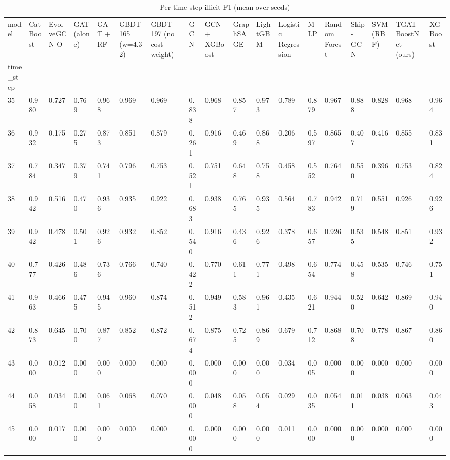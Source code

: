 \begin{table}
\caption{Per-time-step illicit F1 (mean over seeds)}
\label{tab:03_per_timestep_f1}
\begin{tabular}{llllllllllllllllll}
\toprule
model & CatBoost & EvolveGCN-O & GAT (alone) & GAT + RF & GBDT-165 (w=4.32) & GBDT-197 (no cost weight) & GCN & GCN + XGBoost & GraphSAGE & LightGBM & Logistic Regression & MLP & Random Forest & Skip-GCN & SVM (RBF) & TGAT-BoostNet (ours) & XGBoost \\
time\_step &  &  &  &  &  &  &  &  &  &  &  &  &  &  &  &  &  \\
\midrule
35 & 0.980 & 0.727 & 0.769 & 0.968 & 0.969 & 0.969 & 0.838 & 0.968 & 0.857 & 0.973 & 0.789 & 0.879 & 0.967 & 0.888 & 0.828 & 0.968 & 0.964 \\
36 & 0.932 & 0.175 & 0.275 & 0.873 & 0.851 & 0.879 & 0.261 & 0.916 & 0.469 & 0.868 & 0.206 & 0.597 & 0.865 & 0.407 & 0.416 & 0.855 & 0.831 \\
37 & 0.784 & 0.347 & 0.379 & 0.741 & 0.796 & 0.753 & 0.521 & 0.751 & 0.648 & 0.758 & 0.458 & 0.552 & 0.764 & 0.550 & 0.396 & 0.753 & 0.824 \\
38 & 0.942 & 0.516 & 0.470 & 0.936 & 0.935 & 0.922 & 0.683 & 0.938 & 0.765 & 0.935 & 0.564 & 0.783 & 0.942 & 0.719 & 0.551 & 0.926 & 0.926 \\
39 & 0.942 & 0.478 & 0.501 & 0.926 & 0.932 & 0.852 & 0.540 & 0.916 & 0.436 & 0.926 & 0.378 & 0.657 & 0.926 & 0.535 & 0.548 & 0.851 & 0.932 \\
40 & 0.777 & 0.426 & 0.486 & 0.736 & 0.766 & 0.740 & 0.422 & 0.770 & 0.611 & 0.771 & 0.498 & 0.654 & 0.774 & 0.458 & 0.535 & 0.746 & 0.751 \\
41 & 0.963 & 0.466 & 0.475 & 0.945 & 0.960 & 0.874 & 0.512 & 0.949 & 0.583 & 0.961 & 0.435 & 0.621 & 0.944 & 0.520 & 0.642 & 0.869 & 0.940 \\
42 & 0.873 & 0.645 & 0.700 & 0.877 & 0.852 & 0.872 & 0.674 & 0.875 & 0.725 & 0.869 & 0.679 & 0.712 & 0.868 & 0.708 & 0.778 & 0.867 & 0.860 \\
43 & 0.000 & 0.012 & 0.000 & 0.000 & 0.000 & 0.000 & 0.000 & 0.000 & 0.000 & 0.000 & 0.034 & 0.005 & 0.000 & 0.000 & 0.000 & 0.000 & 0.000 \\
44 & 0.058 & 0.034 & 0.000 & 0.061 & 0.068 & 0.070 & 0.000 & 0.048 & 0.058 & 0.054 & 0.029 & 0.035 & 0.054 & 0.011 & 0.038 & 0.063 & 0.043 \\
45 & 0.000 & 0.017 & 0.000 & 0.000 & 0.000 & 0.000 & 0.000 & 0.000 & 0.000 & 0.000 & 0.011 & 0.000 & 0.000 & 0.000 & 0.000 & 0.000 & 0.000 \\

\end{tabular}
\end{table}
